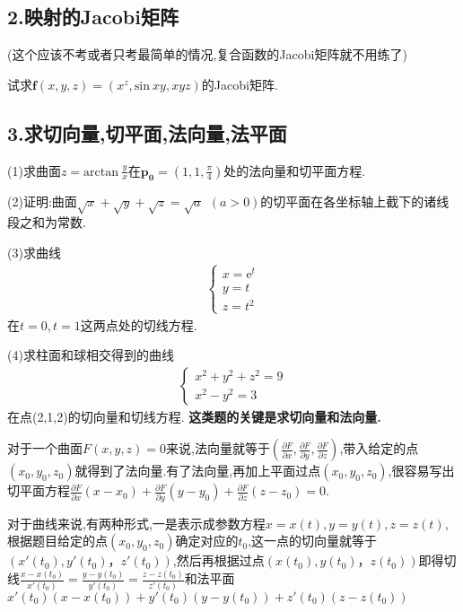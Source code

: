 \documentclass{ctexart}
\begin{document}
\subsection*{2.映射的Jacobi矩阵}

(这个应该不考或者只考最简单的情况,复合函数的Jacobi矩阵就不用练了)

试求$\mathbf{f}(x,y,z)=(x^{z},\mathrm{sin}\ xy,xyz)$的Jacobi矩阵.

\subsection*{3.求切向量,切平面,法向量,法平面}

\noindent (1)求曲面$z=\mathrm{arctan}\ \frac{y}{x}$在$\mathbf{p_{0}}=(1,1,\frac{\pi}{4})$处的法向量和切平面方程.


\noindent (2)证明:曲面$\sqrt{x}+\sqrt{y}+\sqrt{z}=\sqrt{a}\ \ (a>0)$的切平面在各坐标轴上截下的诸线段之和为常数.

\noindent (3)求曲线
\begin{eqnarray}
\begin{cases}
x=\mathrm{e}^{t}\\
y=t\\
z=t^{2}
\end{cases}
\end{eqnarray}
在$t=0,t=1$这两点处的切线方程.


\noindent (4)求柱面和球相交得到的曲线
\begin{eqnarray}
\begin{cases}
x^{2}+y^{2}+z^{2}=9\\
x^{2}-y^{2}=3
\end{cases}
\end{eqnarray}
在点(2,1,2)的切向量和切线方程.
\newline
\newline
\textbf{这类题的关键是求切向量和法向量.}

对于一个曲面$F(x,y,z)=0$来说,法向量就等于$(\frac{\partial F}{\partial x},\frac{\partial F}{\partial y},\frac{\partial F}{\partial z})$,带入给定的点$(x_{0},y_{0},z_{0})$就得到了法向量.有了法向量,再加上平面过点$(x_{0},y_{0},z_{0})$,很容易写出切平面方程$\frac{\partial F}{\partial x}(x-x_{0})+\frac{\partial F}{\partial y}(y-y_{0})+\frac{\partial F}{\partial z}(z-z_{0})=0$.

对于曲线来说,有两种形式,一是表示成参数方程$x=x(t),y=y(t),z=z(t)$,根据题目给定的点$(x_{0},y_{0},z_{0})$确定对应的$t_{0}$,这一点的切向量就等于$(x'(t_{0}),y'(t_{0})，z'(t_{0}))$,然后再根据过点$(x(t_{0}),y(t_{0})，z(t_{0}))$即得切线$\frac{x-x(t_{0})}{x'(t_{0})}=\frac{y-y(t_{0})}{y'(t_{0})}=\frac{z-z(t_{0})}{z'(t_{0})}$和法平面$x'(t_{0})(x-x(t_{0}))+y'(t_{0})(y-y(t_{0}))+z'(t_{0})(z-z(t_{0}))$
\end{document}
